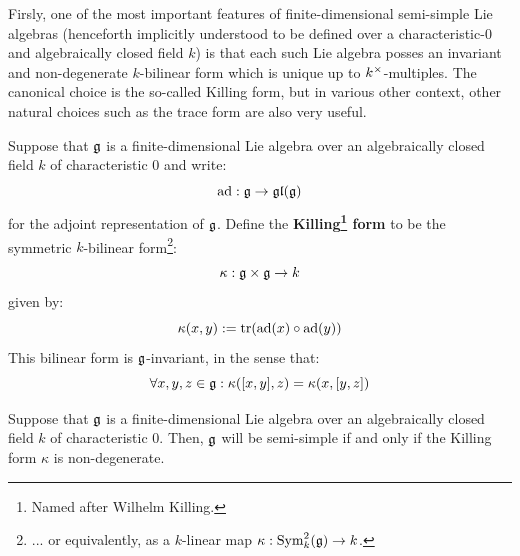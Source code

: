         Firsly, one of the most important features of finite-dimensional semi-simple Lie algebras (henceforth implicitly understood to be defined over a characteristic-$0$ and algebraically closed field $k$) is that each such Lie algebra posses an invariant and non-degenerate $k$-bilinear form which is unique up to $k^{\x}$-multiples. The canonical choice is the so-called Killing form, but in various other context, other natural choices such as the trace form are also very useful. 
        \begin{lemma} \label{lemma: killing_form}
            Suppose that $\mathfrak{g}$ is a finite-dimensional Lie algebra over an algebraically closed field $k$ of characteristic $0$ and write:
                $$\mathrm{ad}: \mathfrak{g} \to \mathfrak{gl}(\mathfrak{g})$$
            for the adjoint representation of $\mathfrak{g}$. Define the \textbf{Killing\footnote{Named after Wilhelm Killing.} form} to be the symmetric $k$-bilinear form\footnote{... or equivalently, as a $k$-linear map $\kappa: \mathrm{Sym}^2_k(\mathfrak{g}) \to k$.}:
                $$\kappa: \g \x \g \to k$$
            given by:
                $$\kappa(x, y) := \operatorname{tr}(\mathrm{ad}(x) \circ \mathrm{ad}(y))$$
            This bilinear form is $\mathfrak{g}$-invariant, in the sense that:
                $$\forall x, y, z \in \mathfrak{g}: \kappa([x, y], z) = \kappa(x, [y, z])$$
        \end{lemma}
        \begin{proposition} \label{prop: cartan_semi_simplicity_criterion}
            Suppose that $\mathfrak{g}$ is a finite-dimensional Lie algebra over an algebraically closed field $k$ of characteristic $0$. Then, $\mathfrak{g}$ will be semi-simple if and only if the Killing form $\kappa$ is non-degenerate. 
        \end{proposition}
